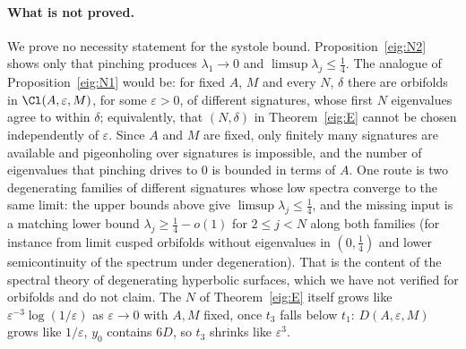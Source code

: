 \paragraph{What is not proved.} We prove no necessity statement for the systole bound. Proposition~\ref{eig:N2} shows only that pinching produces $\lambda_1\to0$ and $\limsup\lambda_j\le\frac14$. The analogue of Proposition~\ref{eig:N1} would be: for fixed $A$, $M$ and every $N$, $\delta$ there are orbifolds in $\Cl(A,\varepsilon,M)$, for some $\varepsilon>0$, of different signatures, whose first $N$ eigenvalues agree to within $\delta$; equivalently, that $(N,\delta)$ in Theorem~\ref{eig:E} cannot be chosen independently of $\varepsilon$. Since $A$ and $M$ are fixed, only finitely many signatures are available and pigeonholing over signatures is impossible, and the number of eigenvalues that pinching drives to $0$ is bounded in terms of $A$. One route is two degenerating families of different signatures whose low spectra converge to the same limit: the upper bounds above give $\limsup\lambda_j\le\frac14$, and the missing input is a matching lower bound $\lambda_j\ge\frac14-o(1)$ for $2\le j<N$ along both families (for instance from limit cusped orbifolds without eigenvalues in $(0,\frac14)$ and lower semicontinuity of the spectrum under degeneration). That is the content of the spectral theory of degenerating hyperbolic surfaces, which we have not verified for orbifolds and do not claim. The $N$ of Theorem~\ref{eig:E} itself grows like $\varepsilon^{-3}\log(1/\varepsilon)$ as $\varepsilon\to0$ with $A,M$ fixed, once $t_3$ falls below $t_1$: $D(A,\varepsilon,M)$ grows like $1/\varepsilon$, $y_0$ contains $6D$, so $t_3$ shrinks like $\varepsilon^3$.
